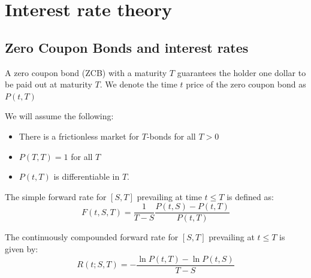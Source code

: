 \chapter{Interest rate theory}
\label{chp_interest_rate_theory}

\section{Zero Coupon Bonds and interest rates}

\begin{definition}
A zero coupon bond (ZCB)  with a maturity $T$ guarantees the holder one dollar to be paid out at maturity $T$. We denote the time $t$ price of the zero coupon bond as $P(t,T)$
\end{definition}

We will assume the following: 
\begin{itemize}
    \item There is a frictionless market for $T$-bonds for all $T>0$
    \item $P(T,T) = 1$ for all $T$
    \item $P(t,T)$ is differentiable in $T$.
\end{itemize} 


\begin{definition}
The simple forward rate for $[S,T]$ prevailing at time $t\leq T$
is defined as: 
\begin{equation*}
F(t,S,T) = \frac{1}{T-S}\frac{P(t,S)-P(t,T)}{P(t,T)}    
\end{equation*}
\end{definition}

\begin{definition}
The continuously compounded forward rate for $[S,T]$ prevailing at $t\leq T$ is given by:
\begin{equation*}
    R(t;S,T) = -\frac{\ln{P(t,T)}-\ln{P(t,S)}}{T-S}
\end{equation*}    
\end{definition}

